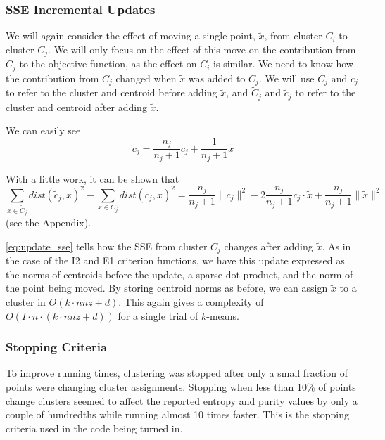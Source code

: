 \documentclass[11pt]{article}
\begin{document}
        \subsubsection{SSE Incremental Updates}
        We will again consider the effect of moving a single point, $\tilde{x}$, from cluster $C_i$ to cluster $C_j$. We will only focus on the effect
        of this move on the contribution from $C_j$ to the objective function, as the effect on $C_i$ is similar. We need to know how the contribution
        from $C_j$ changed when $\tilde{x}$ was added to $C_j$. We will use $C_j$ and $c_j$ to refer to the cluster and centroid before adding
        $\tilde{x}$, and $\tilde{C}_j$ and $\tilde{c}_j$ to refer to the cluster and centroid after adding $\tilde{x}$.

        We can easily see
        \begin{equation}
          \tilde{c}_j = \frac{n_j}{n_j + 1} c_j + \frac{1}{n_j + 1} \tilde{x}
          \label{eq:centroid_update}
        \end{equation}

        With a little work, it can be shown that
        \begin{equation}
          \sum_{x \in \tilde{C}_j} dist( \tilde{c}_j, x)^2 - \sum_{x \in C_j} dist( c_j, x )^2 = \frac{n_j}{n_j + 1} \| c_j \|^2 - 2
          \frac{n_j}{n_j + 1} c_j \cdot \tilde{x} + \frac{n_j}{n_j + 1} \|\tilde{x}\|^2
          \label{eq:update_sse}
        \end{equation}
        (see the Appendix).

        \eqref{eq:update_sse} tells how the SSE from cluster $C_j$ changes after adding $\tilde{x}$. As in the case of the I2 and E1 criterion
        functions, we have this update expressed as the norms of centroids before the update, a sparse dot product, and the norm of the point being
        moved. By storing centroid norms as before, we can assign $\tilde{x}$ to a cluster in $O(k \cdot nnz + d)$. This again gives a complexity of
        $O(I \cdot n \cdot (k \cdot nnz + d))$ for a single trial of $k$-means.

        \subsubsection{Stopping Criteria}
        To improve running times, clustering was stopped after only a small fraction of points were changing cluster assignments. Stopping when less
        than 10\% of points change clusters seemed to affect the reported entropy and purity values by only a couple of hundredths while running
        almost 10 times faster. This is the stopping criteria used in the code being turned in.
\end{document}
